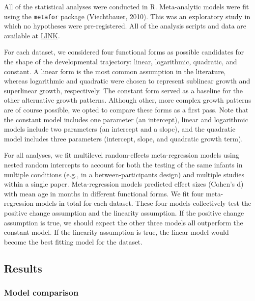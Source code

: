 \documentclass[
  man]{apa6}
\begin{document}
All of the statistical analyses were conducted in R. Meta-analytic models were fit using the \texttt{metafor} package (Viechtbauer, 2010). This was an exploratory study in which no hypotheses were pre-registered. All of the analysis scripts and data are available at \href{https://github.com/anjiecao/metalabr_exp}{LINK}.

For each dataset, we considered four functional forms as possible candidates for the shape of the developmental trajectory: linear, logarithmic, quadratic, and constant. A linear form is the most common assumption in the literature, whereas logarithmic and quadratic were chosen to represent sublinear growth and superlinear growth, respectively. The constant form served as a baseline for the other alternative growth patterns. Although other, more complex growth patterns are of course possible, we opted to compare these forms as a first pass. Note that the constant model includes one parameter (an intercept), linear and logarithmic models include two parameters (an intercept and a slope), and the quadratic model includes three parameters (intercept, slope, and quadratic growth term).

For all analyses, we fit multilevel random-effects meta-regression models using nested random intercepts to account for both the testing of the same infants in multiple conditions (e.g., in a between-participants design) and multiple studies within a single paper. Meta-regression models predicted effect sizes (Cohen's d) with mean age in months in different functional forms. We fit four meta-regression models in total for each dataset. These four models collectively test the positive change assumption and the linearity assumption. If the positive change assumption is true, we should expect the other three models all outperform the constant model. If the linearity assumption is true, the linear model would become the best fitting model for the dataset.

\hypertarget{results}{%
\subsection{Results}\label{results}}

\hypertarget{model-comparison}{%
\subsubsection{Model comparison}\label{model-comparison}}
\end{document}
